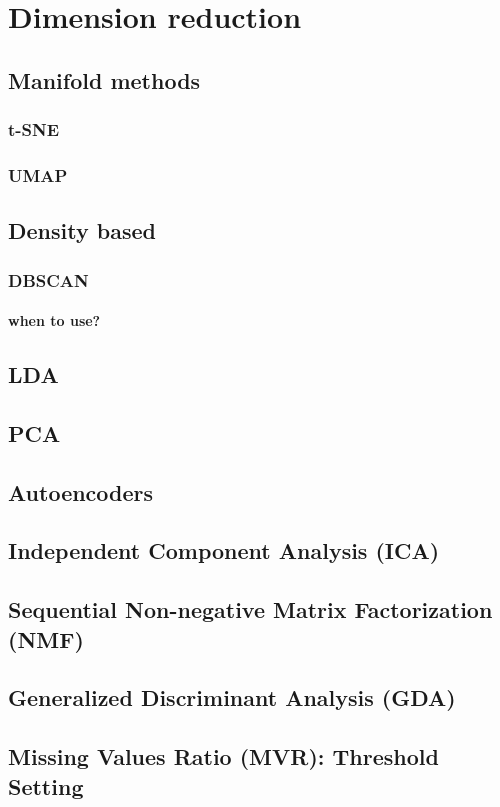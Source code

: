 \chapter{Dimension reduction}
\section{Manifold methods}
    \subsection{t-SNE}
    \subsection{UMAP}
\section{Density based}
    \subsection{DBSCAN}
        \subsubsection{when to use?}
\section{LDA}
\section{PCA}
\section{Autoencoders}
\section{Independent Component Analysis (ICA)}
\section{Sequential Non-negative Matrix Factorization (NMF)}
\section{Generalized Discriminant Analysis (GDA)}
\section{Missing Values Ratio (MVR): Threshold Setting}
